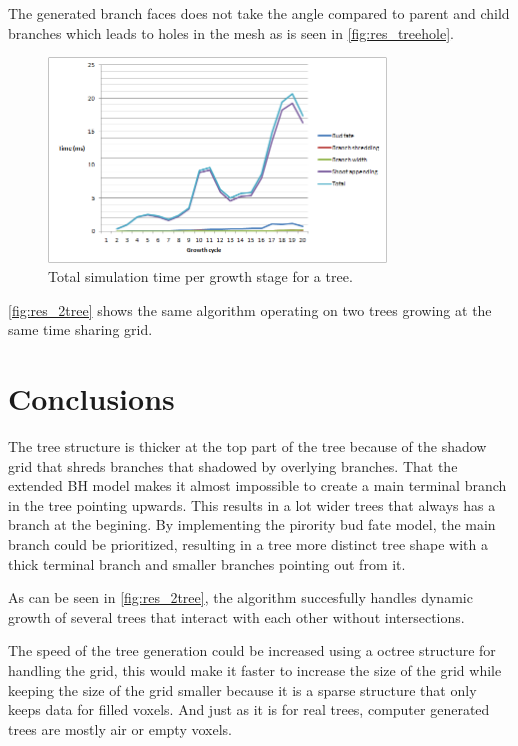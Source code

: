 \documentclass[11pt]{article} %
\begin{document}
The generated branch faces does not take the angle compared to parent and child branches which leads to holes in the mesh as is seen in \autoref{fig:res_treehole}.

\begin{figure}[htp]
	\centering
	\includegraphics[width=0.8\textwidth]{timingTotal.png}
	\caption{Total simulation time per growth stage for a tree.}
	\label{fig:res_timingTotal}
\end{figure}

\autoref{fig:res_2tree} shows the same algorithm operating on two trees growing at the same time sharing grid.



\section{Conclusions}
The tree structure is thicker at the top part of the tree because of the shadow grid that shreds branches that shadowed by overlying branches.
That the extended BH model makes it almost impossible to create a main terminal branch in the tree pointing upwards.
This results in a lot wider trees that always has a branch at the begining.
By implementing the pirority bud fate model, the main branch could be prioritized, resulting in a tree more distinct tree shape with a thick terminal branch and smaller branches pointing out from it.

As can be seen in \autoref{fig:res_2tree}, the algorithm succesfully handles dynamic growth of several trees that interact with each other without intersections.

The speed of the tree generation could be increased using a octree structure for handling the grid, this would make it faster to increase the size of the grid while keeping the size of the grid smaller because it is a sparse structure that only keeps data for filled voxels.
And just as it is for real trees, computer generated trees are mostly air or empty voxels.
\end{document}
